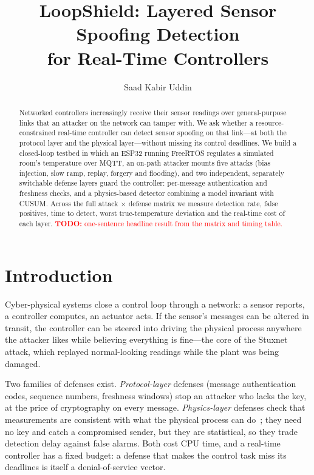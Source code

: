 \documentclass[10pt,twocolumn]{article}
\title{\textbf{LoopShield: Layered Sensor Spoofing Detection\\for Real-Time Controllers}}
\author{Saad Kabir Uddin}
\date{}
\newcommand{\todo}[1]{\textcolor{red}{\textbf{TODO:} #1}}
\begin{document}
\maketitle

\begin{abstract}
Networked controllers increasingly receive their sensor readings over
general-purpose links that an attacker on the network can tamper with. We ask
whether a resource-constrained real-time controller can detect sensor spoofing
on that link---at both the protocol layer and the physical layer---without
missing its control deadlines. We build a closed-loop testbed in which an
ESP32 running FreeRTOS regulates a simulated room's temperature over MQTT,
an on-path attacker mounts five attacks (bias injection, slow ramp, replay,
forgery and flooding), and two independent, separately switchable defense
layers guard the controller: per-message authentication and freshness checks,
and a physics-based detector combining a model invariant with CUSUM.
Across the full attack $\times$ defense matrix we measure detection rate, false
positives, time to detect, worst true-temperature deviation and the real-time
cost of each layer. \todo{one-sentence headline result from the matrix and timing table.}
\end{abstract}

\section{Introduction}
Cyber-physical systems close a control loop through a network: a sensor
reports, a controller computes, an actuator acts. If the sensor's messages can
be altered in transit, the controller can be steered into driving the physical
process anywhere the attacker likes while believing everything is
fine---the core of the Stuxnet attack, which replayed normal-looking readings
while the plant was being damaged.

Two families of defenses exist. \emph{Protocol-layer} defenses (message
authentication codes, sequence numbers, freshness windows) stop an attacker who
lacks the key, at the price of cryptography on every message. \emph{Physics-layer}
defenses check that measurements are consistent with what the physical process
can do~\cite{cardenas2011,giraldo2018}; they need no key and catch a compromised
sender, but they are statistical, so they trade detection delay against false
alarms. Both cost CPU time, and a real-time controller has a fixed budget: a
defense that makes the control task miss its deadlines is itself a
denial-of-service vector.
\end{document}
